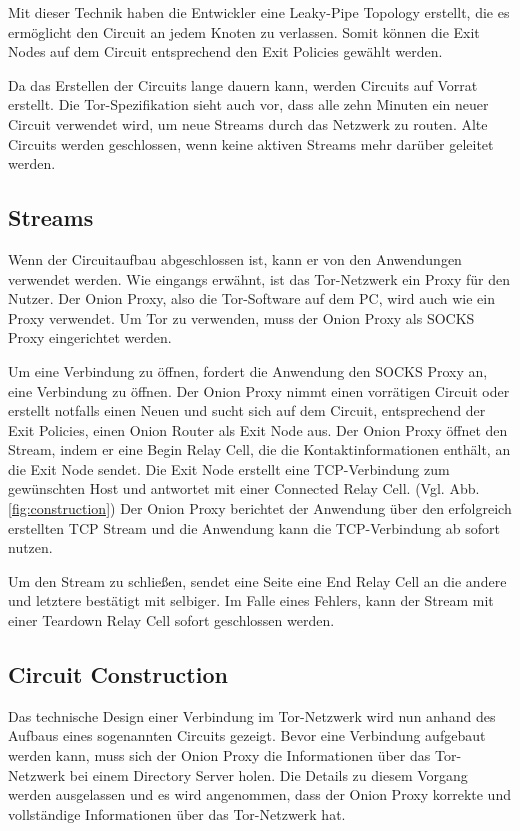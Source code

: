 \documentclass[fleqn,envcountsame,runningheads,10pt,a4paper]{llncs}
\begin{document}
Mit dieser Technik haben die Entwickler eine Leaky-Pipe Topology erstellt, die 
es ermöglicht den Circuit an jedem Knoten zu verlassen. Somit können die Exit 
Nodes auf dem Circuit entsprechend den Exit Policies gewählt werden.

Da das Erstellen der Circuits lange dauern kann, werden Circuits auf Vorrat 
erstellt. Die Tor-Spezifikation sieht auch vor, dass alle zehn Minuten 
ein neuer Circuit verwendet wird, um neue Streams durch das Netzwerk zu routen. 
Alte Circuits werden geschlossen, wenn keine aktiven Streams mehr darüber 
geleitet werden.

\subsection{Streams}

Wenn der Circuitaufbau abgeschlossen ist, kann er von den Anwendungen verwendet 
werden. Wie eingangs erwähnt, ist das Tor-Netzwerk ein Proxy für den Nutzer. Der 
Onion Proxy, also die Tor-Software auf dem PC, wird auch wie ein Proxy 
verwendet. Um Tor zu verwenden, muss der Onion Proxy als SOCKS Proxy 
\cite{rfc:socks} eingerichtet werden.

Um eine Verbindung zu öffnen, fordert die Anwendung den SOCKS Proxy an, eine 
Verbindung zu öffnen. Der Onion Proxy nimmt einen vorrätigen Circuit oder 
erstellt notfalls einen Neuen und sucht sich auf dem Circuit, entsprechend der 
Exit Policies, einen Onion Router als Exit Node aus. Der Onion Proxy öffnet den 
Stream, indem er eine Begin Relay Cell, die die Kontaktinformationen enthält, an 
die Exit Node sendet. Die Exit Node erstellt eine TCP-Verbindung zum gewünschten 
Host und antwortet mit einer Connected Relay Cell. (Vgl. Abb. 
\ref{fig:construction}) Der Onion Proxy berichtet der Anwendung über den 
erfolgreich erstellten TCP Stream und die Anwendung kann die TCP-Verbindung ab 
sofort nutzen.

Um den Stream zu schließen, sendet eine Seite eine End Relay Cell an die andere 
und letztere bestätigt mit selbiger. Im Falle eines Fehlers, kann der Stream mit 
einer Teardown Relay Cell sofort geschlossen werden.

\subsection{Circuit Construction}
\label{sec:ciruit_construction} 

Das technische Design einer Verbindung im Tor-Netzwerk wird nun anhand des 
Aufbaus eines sogenannten Circuits gezeigt. Bevor eine Verbindung aufgebaut 
werden kann, muss sich der Onion Proxy die Informationen über das Tor-Netzwerk 
bei einem Directory Server holen. Die Details zu diesem Vorgang werden 
ausgelassen und es wird angenommen, dass der Onion Proxy korrekte und 
vollständige Informationen über das Tor-Netzwerk hat.
\end{document}
